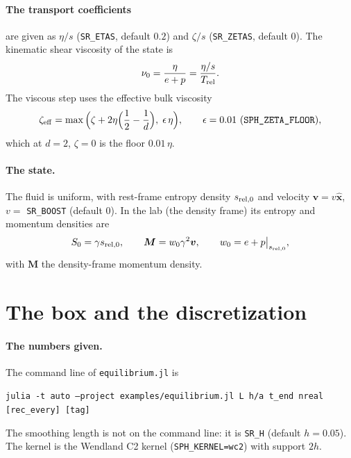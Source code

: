 \documentclass[11pt,aps,preprint,nofootinbib,superscriptaddress,tightenlines]{revtex4-2}
\def\st{\begin{equation}}
\def\stp{\end{equation}}
\let\oldparagraph\paragraph
\renewcommand{\paragraph}{\par\bigskip\oldparagraph}
\begin{document}
\paragraph{The transport coefficients} are given as $\eta/s$ (\texttt{SR\_ETAS}, default $0.2$) and $\zeta/s$ (\texttt{SR\_ZETAS},
default $0$).  The kinematic shear viscosity of the state is
\st
\nu_0=\frac{\eta}{e+p}=\frac{\eta/s}{T_{\rm rel}} .
\label{eq:nu0}
\stp
The viscous step uses the effective bulk viscosity
\st
\zeta_{\rm eff}=\max\Big(\zeta+2\eta\Big(\frac12-\frac1d\Big),\;\epsilon\,\eta\Big),\qquad \epsilon=0.01\ (\texttt{SPH\_ZETA\_FLOOR}),
\stp
which at $d=2$, $\zeta=0$ is the floor $0.01\,\eta$.

\paragraph{The state.}  The fluid is uniform, with rest-frame entropy density $s_{\rm rel,0}$ and velocity $\bm v=v\hat{\bm x}$, $v=$
\texttt{SR\_BOOST} (default $0$).  In the lab (the density frame) its entropy and momentum densities are
\st
S_0=\gamma s_{\rm rel,0},\qquad \bm M=w_0\gamma^2\bm v,\qquad w_0=e+p\big|_{s_{\rm rel,0}},
\label{eq:lab}
\stp
with $\bm M$ the density-frame momentum density.

\section{The box and the discretization}
\label{sec:discretization}

\paragraph{The numbers given.}  The command line of \texttt{equilibrium.jl} is
\begin{center}
\texttt{julia -t auto --project examples/equilibrium.jl L h/a t\_end nreal [rec\_every] [tag]}
\end{center}
The smoothing length is not on the command line: it is \texttt{SR\_H} (default $h=0.05$).  The kernel is the Wendland C2 kernel
(\texttt{SPH\_KERNEL=wc2}) with support $2h$.
\end{document}
